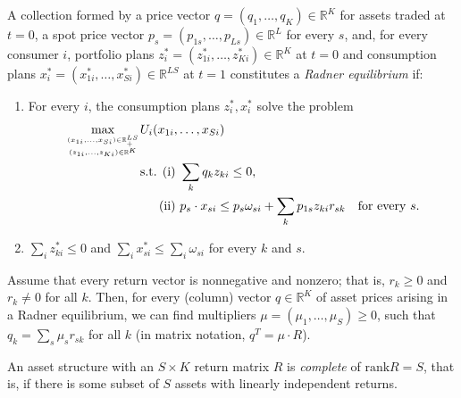 \begin{defn}
    A collection formed by a price vector $q = (q_1, \dots, q_K) \in \mathbb{R}^{K}$ for assets traded at $t = 0$, a spot price vector $p_s = (p_{1s}, \dots, p_{Ls}) \in \mathbb{R}^{L}$ for every $s$, and, for every consumer $i$, portfolio plans $z^*_i = (z^*_{1i}, \dots, z^*_{Ki}) \in \mathbb{R}^{K}$ at $t = 0$ and consumption plans $x^*_i = (x^*_{1i}, \dots, x^*_{Si}) \in \mathbb{R}^{LS}$ at $t = 1$ constitutes a \emph{Radner equilibrium} if:
    \begin{enumerate}
        \item 
        For every $i$, the consumption plans $z^*_i, x^*_i$ solve the problem
        \begin{equation*}
            \begin{aligned}
                \max_{\genfrac{}{}{0pt}{}{(x_{1i}, \dots, x_{Si}) \in \mathbb{R}^{LS}_+}{(z_{1i}, \dots, z_{Ki}) \in \mathbb{R}^{K}}} & U_i(x_{1i}, \dots, x_{Si})\\
                &\begin{aligned}
                    \text{s.t. (i) } & \sum_k q_k z_{ki} \leq 0, \\
                    \text{(ii) } & p_s \cdot x_{si} \leq p_s \omega_{si} + \sum_k p_{1s} z_{ki} r_{sk} \quad \text{for every } s.
                \end{aligned}
            \end{aligned}
        \end{equation*}

        \item 
        $\sum_i z^*_{ki} \leq 0$ and $\sum_i x^*_{si} \leq \sum_i \omega_{si}$ for every $k$ and $s$.
    \end{enumerate}
\end{defn}

\begin{prop}
    Assume that every return vector is nonnegative and nonzero; that is, $r_k \geq 0$ and $r_k \neq 0$ for all $k$. Then, for every (column) vector $q \in \mathbb{R}^{K}$ of asset prices arising in a Radner equilibrium, we can find multipliers $\mu = (\mu_1, \dots, \mu_S) \geq 0$, such that $q_k = \sum_s \mu_s r_{sk}$ for all $k$ (in matrix notation, $q^T = \mu \cdot R$).
\end{prop}

\begin{defn}
    An asset structure with an $S \times K$ return matrix $R$ is \emph{complete} of $\text{rank}R = S$, that is, if there is some subset of $S$ assets with linearly independent returns.
\end{defn}

